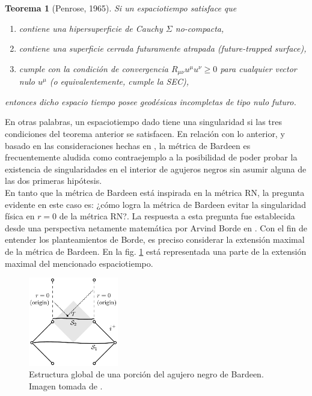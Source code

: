 \documentclass{article}
\numberwithin{equation}{section}
\newtheorem{theorem}{Teorema}[section]
\begin{document}
\begin{theorem}[Penrose, 1965]
\label{penrose sing thm}
Si un espaciotiempo satisface que

\begin{enumerate}[i]
\item contiene una hipersuperficie de Cauchy $\Sigma$ no-compacta,

\item contiene una superficie cerrada futuramente atrapada (future-trapped surface),

\item cumple con la condición de convergencia $R_{\mu \nu}u^{\mu}u^{\nu} \geq 0$ para cualquier vector nulo $u^{\mu}$ (o equivalentemente, cumple la SEC),
\end{enumerate}

entonces dicho espacio tiempo posee geodésicas incompletas de tipo nulo futuro.
\end{theorem}

En otras palabras, un espaciotiempo dado tiene una singularidad si las tres condiciones del teorema anterior se satisfacen. En relación con lo anterior, y basado en las consideraciones hechas en \cite{borde1994,borde1996}, la métrica de Bardeen es frecuentemente aludida como contraejemplo a la posibilidad de poder probar la existencia de singularidades en el interior de agujeros negros sin asumir alguna de las dos primeras hipótesis.\\

En tanto que la métrica de Bardeen está inspirada en la métrica RN, la pregunta evidente en este caso es: ¿cómo logra la métrica de Bardeen evitar la singularidad física en $r = 0$ de la métrica RN?. La respuesta a esta pregunta fue establecida desde una perspectiva netamente matemática por Arvind Borde en \cite{borde1994,borde1996}. Con el fin de entender los planteamientos de Borde, es preciso considerar la extensión maximal de la métrica de Bardeen. En la fig. \ref{fig: bardeen diagram} está representada una parte de la extensión maximal del mencionado espaciotiempo.\\

\begin{figure}
	\centering
	\includegraphics[width=0.35\textwidth]{bardeenDiagram}
	\caption{Estructura global de una porción del agujero negro de Bardeen. Imagen tomada de \cite{borde1994}.}
	\label{fig: bardeen diagram}
\end{figure}
\end{document}
